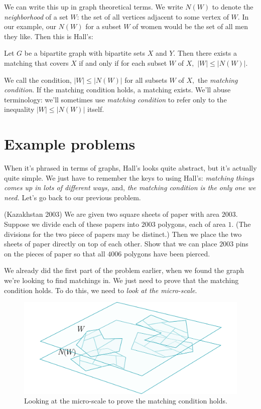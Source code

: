 \documentclass[11pt,paper=letter]{scrartcl}
\begin{document}
We can write this up in graph theoretical terms. We write $N(W)$ to denote the \emph{neighborhood} of a set $W$: the set of all vertices adjacent to some vertex of $W.$ In our example, our $N(W)$ for a subset $W$ of women would be the set of all men they like. Then this is Hall's:

\begin{theorem*} Let $G$ be a bipartite graph with bipartite sets $X$ and $Y.$ Then there exists a matching that covers $X$ if and only if for each subset $W$ of $X,$ $|W| \leq |N(W)|.$\end{theorem*}

We call the condition, $|W| \leq |N(W)|$ for all subsets $W$ of $X,$ the \emph{matching condition}. If the matching condition holds, a matching exists. We'll abuse terminology: we'll sometimes use \emph{matching condition} to refer only to the inequality $|W| \leq |N(W)|$ itself.

\section{Example problems}

When it's phrased in terms of graphs, Hall's looks quite abstract, but it's actually quite simple. We just have to remember the keys to using Hall's: \emph{matching things comes up in lots of different ways,} and, \emph{the matching condition is the only one we need.} Let's go back to our previous problem.

\begin{problem}
  (Kazakhstan 2003) We are given two square sheets of paper with area $2003.$ Suppose we divide each of these papers into $2003$ polygons, each of area $1.$ (The divisions for the two piece of papers may be distinct.) Then we place the two sheets of paper directly on top of each other. Show that we can place $2003$ pins on the pieces of paper so that all $4006$ polygons have been pierced.
\end{problem}

We already did the first part of the problem earlier, when we found the graph we're looking to find matchings in. We just need to prove that the matching condition holds. To do this, we need to \emph{look at the micro-scale}.

\begin{figure}
  \centering
  \includegraphics[width=\textwidth]{figure7.png}
  \caption{Looking at the micro-scale to prove the matching condition holds.}
\end{figure}
\end{document}
